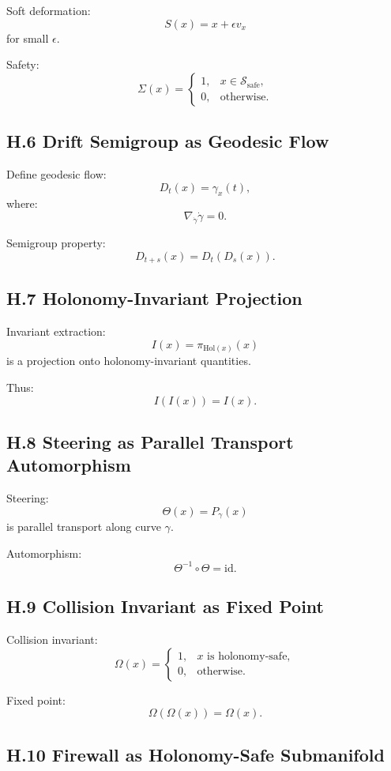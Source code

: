 Soft deformation:
\[
S(x) = x + \epsilon v_x
\]
for small $\epsilon$.

Safety:
\[
\Sigma(x) = 
\begin{cases}
1, & x \in \mathcal{S}_{\mathrm{safe}}, \\
0, & \text{otherwise}.
\end{cases}
\]

\subsection*{H.6 Drift Semigroup as Geodesic Flow}

Define geodesic flow:
\[
D_t(x) = \gamma_x(t),
\]
where:
\[
\nabla_{\dot{\gamma}} \dot{\gamma} = 0.
\]

Semigroup property:
\[
D_{t+s}(x) = D_t(D_s(x)).
\]

\subsection*{H.7 Holonomy-Invariant Projection}

Invariant extraction:
\[
I(x) = \pi_{\mathrm{Hol}(x)}(x)
\]
is a projection onto holonomy-invariant quantities.

Thus:
\[
I(I(x)) = I(x).
\]

\subsection*{H.8 Steering as Parallel Transport Automorphism}

Steering:
\[
\Theta(x) = P_{\gamma}(x)
\]
is parallel transport along curve $\gamma$.

Automorphism:
\[
\Theta^{-1} \circ \Theta = \mathrm{id}.
\]

\subsection*{H.9 Collision Invariant as Fixed Point}

Collision invariant:
\[
\Omega(x) = 
\begin{cases}
1, & x \text{ is holonomy-safe}, \\
0, & \text{otherwise}.
\end{cases}
\]

Fixed point:
\[
\Omega(\Omega(x)) = \Omega(x).
\]

\subsection*{H.10 Firewall as Holonomy-Safe Submanifold}

